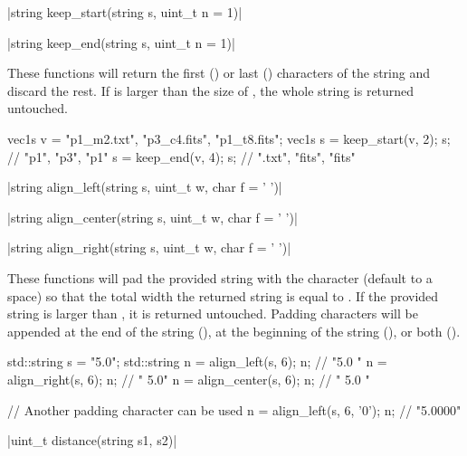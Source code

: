 \item \vectorfunc \cppinline|string keep_start(string s, uint_t n = 1)| 

\vectorfunc \cppinline|string keep_end(string s, uint_t n = 1)| 

These functions will return the first () or last ()  characters of the string  and discard the rest. If  is larger than the size of , the whole string is returned untouched.

\begin{example}
\begin{cppcode}
vec1s v = {"p1_m2.txt", "p3_c4.fits", "p1_t8.fits"};
vec1s s = keep_start(v, 2);
s; // {"p1", "p3", "p1"}
s = keep_end(v, 4);
s; // {".txt", "fits", "fits"}
\end{cppcode}
\end{example}

\item \vectorfunc \cppinline|string align_left(string s, uint_t w, char f = ' ')| 

\vectorfunc \cppinline|string align_center(string s, uint_t w, char f = ' ')| 

\vectorfunc \cppinline|string align_right(string s, uint_t w, char f = ' ')| 

These functions will pad the provided string with the character  (default to a space) so that the total width the returned string is equal to . If the provided string is larger than , it is returned untouched. Padding characters will be appended at the end of the string (), at the beginning of the string (), or both ().

\begin{example}
\begin{cppcode}
std::string s = "5.0";
std::string n = align_left(s, 6);
n; // "5.0   "
n = align_right(s, 6);
n; // "   5.0"
n = align_center(s, 6);
n; // " 5.0  "

// Another padding character can be used
n = align_left(s, 6, '0');
n; // "5.0000"
\end{cppcode}
\end{example}

\item \vectorfunc \cppinline|uint_t distance(string s1, s2)| 

